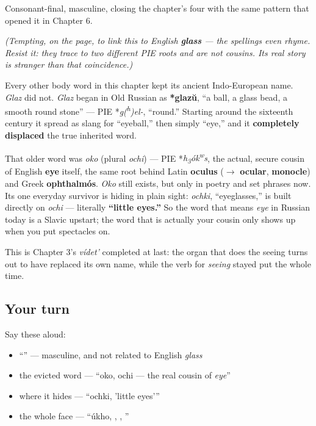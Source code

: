Consonant-final, masculine, closing the chapter's four with the same pattern that opened it in Chapter 6.

\emph{(Tempting, on the page, to link this to English \textbf{glass} — the spellings even rhyme. Resist it: they trace to two different PIE roots and are not cousins. Its real story is stranger than that coincidence.)}

\begin{cousinweb}
Every other body word in this chapter kept its ancient Indo-European name. \emph{Glaz} did not. \emph{Glaz} began in Old Russian as \textbf{*glazŭ}, \textquotedblleft{}a ball, a glass bead, a smooth round stone\textquotedblright{} — PIE *\emph{g(\textsuperscript{h})el-}, \textquotedblleft{}round.\textquotedblright{} Starting around the sixteenth century it spread as slang for \textquotedblleft{}eyeball,\textquotedblright{} then simply \textquotedblleft{}eye,\textquotedblright{} and it \textbf{completely displaced} the true inherited word.

That older word was \emph{oko} (plural \emph{ochi}) — PIE *\emph{h\textsubscript{3}ók\textsuperscript{w}s}, the actual, secure cousin of English \textbf{eye} itself, the same root behind Latin \textbf{oculus} ($\to$ \textbf{ocular}, \textbf{monocle}) and Greek \textbf{ophthalmós}. \emph{Oko} still exists, but only in poetry and set phrases now. Its one everyday survivor is hiding in plain sight: \emph{ochki}, \textquotedblleft{}eyeglasses,\textquotedblright{} is built directly on \emph{ochi} — literally \textbf{\textquotedblleft{}little eyes.\textquotedblright{}} So the word that means \emph{eye} in Russian today is a Slavic upstart; the word that is actually your cousin only shows up when you put spectacles on.

This is Chapter 3's \emph{vídet'} completed at last: the organ that does the seeing turns out to have replaced its own name, while the verb for \emph{seeing} stayed put the whole time.
\end{cousinweb}

\subsection*{Your turn}
Say these aloud:

\begin{itemize}
\raggedright
  \item \textquotedblleft{}\textquotedblright{} — masculine, and not related to English \emph{glass}
  \item the evicted word — \textquotedblleft{}oko, ochi — the real cousin of \emph{eye}\textquotedblright{}
  \item where it hides — \textquotedblleft{}ochki, 'little eyes'\textquotedblright{}
  \item the whole face — \textquotedblleft{}úkho, , , \textquotedblright{}
\end{itemize}

